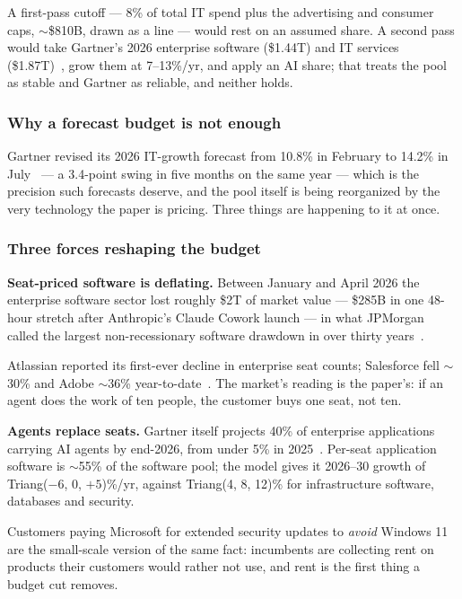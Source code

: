\documentclass[11pt,letterpaper]{article}
\newcommand{\lead}[1]{{\color{leadwarm}\sffamily\bfseries #1}}
\begin{document}
A first-pass cutoff --- 8\% of total IT spend plus the advertising and consumer caps, $\sim$\$810B, drawn as a line --- would rest on an assumed share. A second pass would take Gartner's 2026 enterprise software (\$1.44T) and IT services (\$1.87T)~\cite{ref:gartner_it_jul2026}, grow them at 7--13\%/yr, and apply an AI share; that treats the pool as stable and Gartner as reliable, and neither holds.

\subsubsection*{Why a forecast budget is not enough}
Gartner revised its 2026 IT-growth forecast from 10.8\% in February to 14.2\% in July~\cite{ref:gartner_it_feb2026,ref:gartner_it_jul2026} --- a 3.4-point swing in five months on the same year --- which is the precision such forecasts deserve, and the pool itself is being reorganized by the very technology the paper is pricing. Three things are happening to it at once.

\subsubsection*{Three forces reshaping the budget}
\lead{Seat-priced software is deflating.} Between January and April 2026 the enterprise software sector lost roughly \$2T of market value --- \$285B in one 48-hour stretch after Anthropic's Claude Cowork launch --- in what JPMorgan called the largest non-recessionary software drawdown in over thirty years~\cite{ref:saaspocalypse_ti,ref:saaspocalypse_nx}.

Atlassian reported its first-ever decline in enterprise seat counts; Salesforce fell $\sim$30\% and Adobe $\sim$36\% year-to-date~\cite{ref:saaspocalypse_fc}. The market's reading is the paper's: if an agent does the work of ten people, the customer buys one seat, not ten.

\lead{Agents replace seats.} Gartner itself projects 40\% of enterprise applications carrying AI agents by end-2026, from under 5\% in 2025~\cite{ref:saaspocalypse_arbi}. Per-seat application software is $\sim$55\% of the software pool; the model gives it 2026--30 growth of Triang($-6$, 0, $+5$)\%/yr, against Triang(4, 8, 12)\% for infrastructure software, databases and security.

Customers paying Microsoft for extended security updates to \emph{avoid} Windows 11 are the small-scale version of the same fact: incumbents are collecting rent on products their customers would rather not use, and rent is the first thing a budget cut removes.
\end{document}
